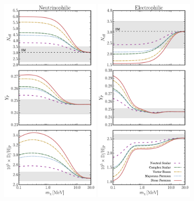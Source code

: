 \documentclass[notitlepage,letterpaper,natbib,aps,prd,onecolumn,amsmath,amsfonts,nofootinbib,preprintnumbers,superscriptaddress,secnumarabic,groupedaddress]{revtex4-1}
\begin{document}
\begin{figure}[t]
    \centering
    \includegraphics[width=0.45\textwidth]{figures/Nu_abundance_plot.pdf} \qquad
    \includegraphics[width=0.45\textwidth]{figures/EE_abundance_plot.pdf}\vspace{-0.2cm}

\end{figure}
\end{document}

